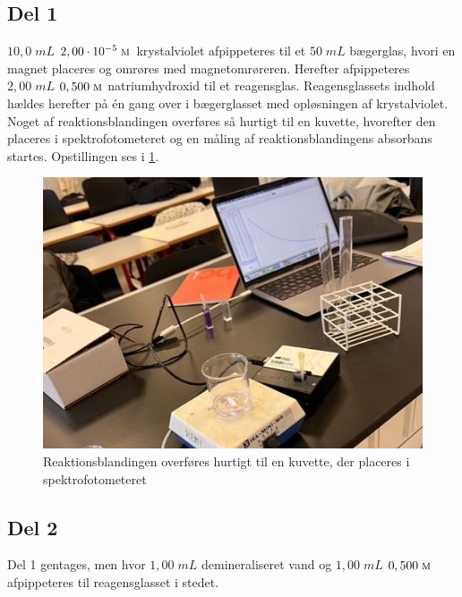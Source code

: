 \documentclass{report}
\begin{document}
\subsection*{Del 1}
$10,0 \;\unit{mL} $ $2,00 \cdot 10 ^{-5} \;\unit{\textsc{m}} $ krystalviolet afpippeteres til et $50 \;\unit{mL} $ bægerglas, hvori en magnet placeres og omrøres med magnetomrøreren. 
Herefter afpippeteres $2,00 \;\unit{mL} $ $0,500 \;\unit{\textsc{m}} $ natriumhydroxid til et reagensglas.
Reagensglassets indhold hældes herefter på én gang over i bægerglasset med opløsningen af krystalviolet.
Noget af reaktionsblandingen overføres så hurtigt til en kuvette, hvorefter den placeres i spektrofotometeret og en måling af reaktionsblandingens absorbans startes.
Opstillingen ses i \cref{fig:opstilling}.
\begin{figure}[H]
\begin{center}
  \includegraphics[width=\textwidth]{opstilling.jpg}
\end{center}
\caption{Reaktionsblandingen overføres hurtigt til en kuvette, der placeres i spektrofotometeret}
\label{fig:opstilling}
\end{figure}
\subsection*{Del 2}
Del 1 gentages, men hvor $1,00 \;\unit{mL} $ demineraliseret vand og $1,00 \;\unit{mL} $ $0,500 \;\unit{\textsc{m}} $  afpippeteres til reagensglasset i stedet.
\end{document}
